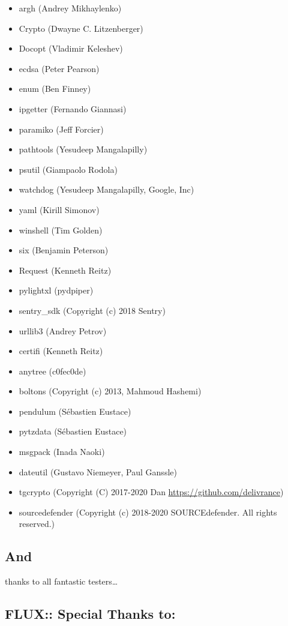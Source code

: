 \documentclass[
  letterpaper,
  DIV=11,
  numbers=noendperiod]{scrreport}
\providecommand{\tightlist}{%
  \setlength{\itemsep}{0pt}\setlength{\parskip}{0pt}}\usepackage{longtable,booktabs,array}
\begin{document}
\begin{itemize}
\tightlist
\item
  argh (Andrey Mikhaylenko)
\item
  Crypto (Dwayne C. Litzenberger)
\item
  Docopt (Vladimir Keleshev)
\item
  ecdsa (Peter Pearson)
\item
  enum (Ben Finney)
\item
  ipgetter (Fernando Giannasi)
\item
  paramiko (Jeff Forcier)
\item
  pathtools (Yesudeep Mangalapilly)
\item
  psutil (Giampaolo Rodola)
\item
  watchdog (Yesudeep Mangalapilly, Google, Inc)
\item
  yaml (Kirill Simonov)
\item
  winshell (Tim Golden)
\item
  six (Benjamin Peterson)
\item
  Request (Kenneth Reitz)
\item
  pylightxl (pydpiper)
\item
  sentry\_sdk (Copyright (c) 2018 Sentry)
\item
  urllib3 (Andrey Petrov)
\item
  certifi (Kenneth Reitz)
\item
  anytree (c0fec0de)
\item
  boltons (Copyright (c) 2013, Mahmoud Hashemi)
\item
  pendulum (Sébastien Eustace)
\item
  pytzdata (Sébastien Eustace)
\item
  msgpack (Inada Naoki)
\item
  dateutil (Gustavo Niemeyer, Paul Ganssle)
\item
  tgcrypto (Copyright (C) 2017-2020 Dan
  \url{https://github.com/delivrance})
\item
  sourcedefender (Copyright (c) 2018-2020 SOURCEdefender. All rights
  reserved.)
\end{itemize}

\hypertarget{and}{%
\subsection{And}\label{and}}

thanks to all fantastic testers\ldots{}

\hypertarget{flux-special-thanks-to}{%
\subsection{FLUX:: Special Thanks to:}\label{flux-special-thanks-to}}
\end{document}
